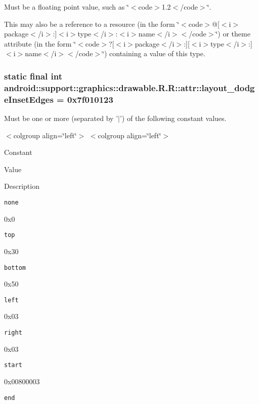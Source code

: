Must be a floating point value, such as \char`\"{}$<$code$>$1.2$<$/code$>$\char`\"{}. 

This may also be a reference to a resource (in the form \char`\"{}$<$code$>$@\mbox{[}$<$i$>$package$<$/i$>$:\mbox{]}$<$i$>$type$<$/i$>$:$<$i$>$name$<$/i$>$$<$/code$>$\char`\"{}) or theme attribute (in the form \char`\"{}$<$code$>$?\mbox{[}$<$i$>$package$<$/i$>$:\mbox{]}\mbox{[}$<$i$>$type$<$/i$>$:\mbox{]}$<$i$>$name$<$/i$>$$<$/code$>$\char`\"{}) containing a value of this type. \hypertarget{classandroid_1_1support_1_1graphics_1_1drawable_1_1_r_1_1attr_485f9c004e688db1b91f39c1aa1bb0e5}{
\subsubsection[{layout\_\-dodgeInsetEdges}]{\setlength{\rightskip}{0pt plus 5cm}static final int android::support::graphics::drawable.R.R::attr::layout\_\-dodgeInsetEdges = 0x7f010123}}
\label{classandroid_1_1support_1_1graphics_1_1drawable_1_1_r_1_1attr_485f9c004e688db1b91f39c1aa1bb0e5}


Must be one or more (separated by '$|$') of the following constant values. \begin{TabularC}{0}
\hline
\end{TabularC}
$<$colgroup align=\char`\"{}left\char`\"{}$>$ $<$colgroup align=\char`\"{}left\char`\"{}$>$ 

Constant

Value

Description 

{\tt none}

0x0

{\tt top}

0x30

{\tt bottom}

0x50

{\tt left}

0x03

{\tt right}

0x03

{\tt start}

0x00800003

{\tt end}

